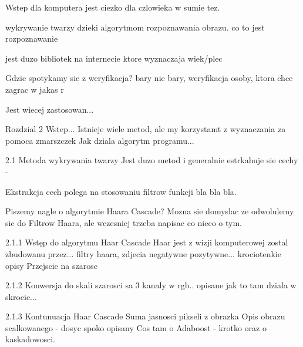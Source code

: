 Wstep
dla komputera jest ciezko dla czlowieka w sumie tez.

wykrywanie twarzy dzieki algorytmom rozpoznawania obrazu. co to jest rozpoznawanie

jest duzo bibliotek na internecie ktore wyznaczaja wiek/plec

Gdzie spotykamy sie z weryfikacja? bary nie bary, weryfikacja osoby, ktora chce zagrac w jakas r

Jest wiecej zastosowan...

Rozdzial 2
Wstep...
Istnieje wiele metod, ale my korzystamt z wyznaczania za pomoca zmarszczek
Jak dziala algorytm programu...

2.1 Metoda wykrywania twarzy
Jest duzo metod i generalnie estrkahuje sie cechy -

Ekstrakcja cech polega na stosowaniu filtrow funkcji bla bla bla.

Piszemy nagle o algorytmie Haara Cascade?
Mozna sie domyslac ze odwolulemy sie do Filtrow Haara, ale wczesniej trzeba napisac co nieco o tym.

2.1.1 Wstęp do algorytmu Haar Cascade
Haar jest z wizji komputerowej zostal zbudowanu przez... filtry haara, zdjecia negatywne pozytywne...
krociotenkie opisy
Przejscie na szarosc %

2.1.2 Konwersja do skali szarosci
sa 3 kanaly w rgb.. opisane jak to tam dziala w skrocie...

2.1.3 Kontunuacja Haar Cascade %
Suma jasnosci pikseli z obrazka
Opis obrazu scalkowanego - dosyc spoko opisany
Cos tam o Adaboost - krotko oraz o kaskadowosci.
